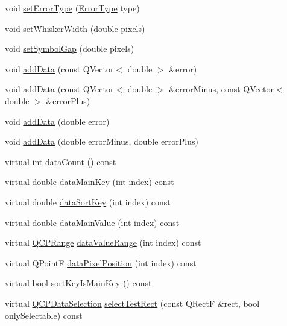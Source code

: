\begin{DoxyCompactItemize}
\item 
void \hyperlink{class_q_c_p_error_bars_af0af493d454a8f3a0908830160680d2b}{set\+Error\+Type} (\hyperlink{class_q_c_p_error_bars_a95f0220f11a72648b96480a85ce26474}{Error\+Type} type)
\item 
void \hyperlink{class_q_c_p_error_bars_ad05f6ff9e46c6047f1cd2459744b7b59}{set\+Whisker\+Width} (double pixels)
\item 
void \hyperlink{class_q_c_p_error_bars_a280ee8d863d8a2630c309701d019b3de}{set\+Symbol\+Gap} (double pixels)
\item 
void \hyperlink{class_q_c_p_error_bars_aae296ad9817b3fa418db284af81cecf8}{add\+Data} (const Q\+Vector$<$ double $>$ \&error)
\item 
void \hyperlink{class_q_c_p_error_bars_a2135cf41d7925a3dcdadd4eb03fd3eb6}{add\+Data} (const Q\+Vector$<$ double $>$ \&error\+Minus, const Q\+Vector$<$ double $>$ \&error\+Plus)
\item 
void \hyperlink{class_q_c_p_error_bars_a39ef73b0e61941fc4064fd3a5224c72a}{add\+Data} (double error)
\item 
void \hyperlink{class_q_c_p_error_bars_a1833c5de9c2fe2952b977505d9f27cd1}{add\+Data} (double error\+Minus, double error\+Plus)
\item 
virtual int \hyperlink{class_q_c_p_error_bars_ad8811b034a17cb4ef898cbcc8da29bd2}{data\+Count} () const
\item 
virtual double \hyperlink{class_q_c_p_error_bars_ae3931213f76cd34a824c42c22a1dca74}{data\+Main\+Key} (int index) const
\item 
virtual double \hyperlink{class_q_c_p_error_bars_a1ef91328ad7dde84695958139d5f40cf}{data\+Sort\+Key} (int index) const
\item 
virtual double \hyperlink{class_q_c_p_error_bars_a88cd90280366b44c2159774bfb7c473a}{data\+Main\+Value} (int index) const
\item 
virtual \hyperlink{class_q_c_p_range}{Q\+C\+P\+Range} \hyperlink{class_q_c_p_error_bars_a09b99cf293b6041ae8d5c52cf8dd599c}{data\+Value\+Range} (int index) const
\item 
virtual Q\+PointF \hyperlink{class_q_c_p_error_bars_a7397bc40751c9c6e2ea188895b2152f8}{data\+Pixel\+Position} (int index) const
\item 
virtual bool \hyperlink{class_q_c_p_error_bars_aa00fcef7b0cb5c54bafe32ab4b16e674}{sort\+Key\+Is\+Main\+Key} () const
\item 
virtual \hyperlink{class_q_c_p_data_selection}{Q\+C\+P\+Data\+Selection} \hyperlink{class_q_c_p_error_bars_ac32f9e729cb205ca56821f9b663472c0}{select\+Test\+Rect} (const Q\+RectF \&rect, bool only\+Selectable) const

\end{DoxyCompactItemize}
